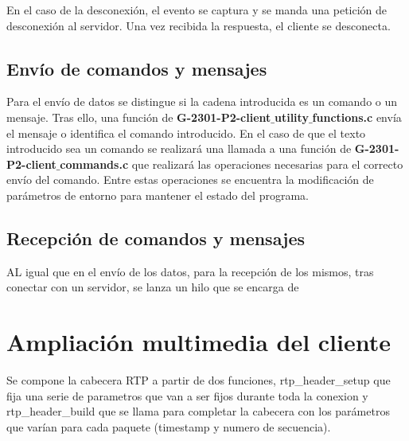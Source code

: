 \documentclass{mathnotes}
\begin{document}
En el caso de la desconexión, el evento se captura y se manda una petición de desconexión al servidor. Una vez recibida la respuesta, el cliente se desconecta.

\subsection{Envío de comandos y mensajes}
Para el envío de datos se distingue si la cadena introducida es un comando o un mensaje.
Tras ello, una función de \textbf{G-2301-P2-client$\_$utility$\_$functions.c} envía el mensaje o identifica el comando introducido. En el caso de que el texto introducido sea un comando se realizará una llamada a una función de \textbf{G-2301-P2-client$\_$commands.c} que realizará las operaciones necesarias para el correcto envío del comando. Entre estas operaciones se encuentra la modificación de parámetros de entorno para mantener el estado del programa.

\subsection{Recepción de comandos y mensajes}
AL igual que en el envío de los datos, para la recepción de los mismos, tras conectar con un servidor, se lanza un hilo que se encarga de

\section{Ampliación multimedia del cliente}
Se compone la cabecera RTP a partir de dos funciones, rtp_header_setup que fija una serie de parametros que van a ser fijos durante toda la conexion y rtp_header_build que se llama para completar la cabecera con los parámetros que varían para cada paquete (timestamp y numero de secuencia).
\end{document}
